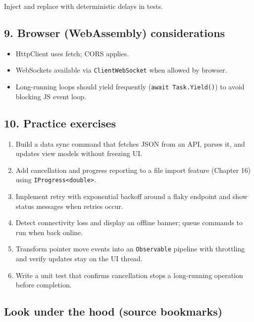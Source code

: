Inject and replace with deterministic delays in tests.

\subsection{9. Browser (WebAssembly)
considerations}\label{browser-webassembly-considerations-1}

\begin{itemize}
\tightlist
\item
  HttpClient uses fetch; CORS applies.
\item
  WebSockets available via \passthrough{\lstinline!ClientWebSocket!}
  when allowed by browser.
\item
  Long-running loops should yield frequently
  (\passthrough{\lstinline!await Task.Yield()!}) to avoid blocking JS
  event loop.
\end{itemize}

\subsection{10. Practice exercises}\label{practice-exercises-11}

\begin{enumerate}
\def\labelenumi{\arabic{enumi}.}
\tightlist
\item
  Build a data sync command that fetches JSON from an API, parses it,
  and updates view models without freezing UI.
\item
  Add cancellation and progress reporting to a file import feature
  (Chapter 16) using \passthrough{\lstinline!IProgress<double>!}.
\item
  Implement retry with exponential backoff around a flaky endpoint and
  show status messages when retries occur.
\item
  Detect connectivity loss and display an offline banner; queue commands
  to run when back online.
\item
  Transform pointer move events into an
  \passthrough{\lstinline!Observable!} pipeline with throttling and
  verify updates stay on the UI thread.
\item
  Write a unit test that confirms cancellation stops a long-running
  operation before completion.
\end{enumerate}

\subsection{Look under the hood (source
bookmarks)}\label{look-under-the-hood-source-bookmarks-15}

